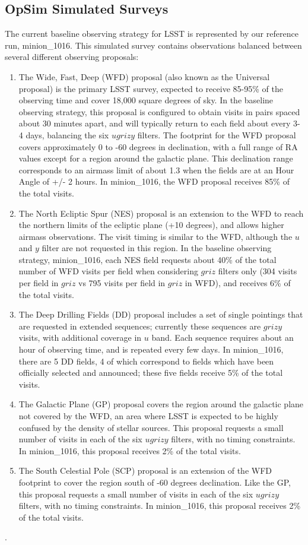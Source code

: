 \subsection{OpSim Simulated Surveys}

The current baseline observing strategy for LSST is represented by our reference run, minion\_1016.  This simulated survey contains observations balanced between several different observing proposals:
\begin{enumerate}
\item The Wide, Fast, Deep (WFD) proposal (also known as the Universal proposal) is the primary LSST survey, expected to receive 85-95\% of the observing time and cover 18,000 square degrees of sky. In the baseline observing strategy, this proposal is configured to obtain visits in pairs spaced about 30 minutes apart, and will typically return to each field about every 3-4 days, balancing the six $ugrizy$ filters. The footprint for the WFD proposal covers approximately 0 to -60 degrees in declination, with a full range of RA values except for a region around the galactic plane. This declination range corresponds to an airmass limit of about 1.3 when the fields are at an Hour Angle of +/- 2 hours. In minion\_1016, the WFD proposal receives 85\% of the total visits.
\item The North Ecliptic Spur (NES) proposal is an extension to the WFD to reach the northern limits of the ecliptic plane (+10 degrees), and allows higher airmass observations. The visit timing is similar to the WFD, although the $u$ and $y$ filter are not requested in this region. In the baseline observing strategy, minion\_1016, each NES field requests about 40\% of the total number of WFD visits per field when considering $griz$ filters only (304 visits per field in $griz$ vs 795 visits per field in $griz$ in WFD), and receives 6\% of the total visits. 
\item The Deep Drilling Fields (DD) proposal includes a set of single pointings that are requested in extended sequences; currently these sequences are $grizy$ visits, with additional coverage in $u$ band. Each sequence requires about an hour of observing time, and is repeated every few days. In minion\_1016, there are 5 DD fields, 4 of which correspond to fields which have been officially selected and announced; these five fields receive 5\% of the total visits. 
\item The Galactic Plane (GP) proposal covers the region around the galactic plane not covered by the WFD, an area where LSST is expected to be highly confused by the density of stellar sources. This proposal requests a small number of visits in each of the six $ugrizy$ filters, with no timing constraints. In minion\_1016, this proposal receives 2\% of the total visits. 
\item The South Celestial Pole (SCP) proposal is an extension of the WFD footprint to cover the region south of -60 degrees declination. Like the GP, this proposal requests a small number of visits in each of the six $ugrizy$ filters, with no timing constraints. In minion\_1016, this proposal receives 2\% of the total visits.
\end{enumerate}. 

